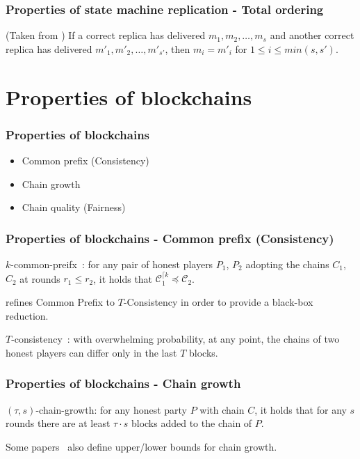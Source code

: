\documentclass{beamer}
\begin{document}
\begin{frame}
\frametitle{Properties of state machine replication - Total ordering}

(Taken from \cite{duan2018beat}) If a correct replica has delivered $m_1, m_2, \dots ,m_s$ and another correct replica has delivered $m'_1,m'_2, \dots,m'_{s'}$, then $m_i = m'_i$ for $1 \leq i \leq min(s, s')$.

\end{frame}


\section{Properties of blockchains}

\begin{frame}
\frametitle{Properties of blockchains}

\begin{itemize}
    \item Common prefix (Consistency)
    \item Chain growth
    \item Chain quality (Fairness)
\end{itemize}

\end{frame}


\begin{frame}
\frametitle{Properties of blockchains - Common prefix (Consistency)}

$k$-common-preifx~\cite{garay2015bitcoin}:
for any pair of honest players $P_1$, $P_2$ adopting the chains $C_1$, $C_2$ at rounds $r_1 \leq r_2$, it holds that $\mathcal{C}_{1}^{\lceil k} \preceq \mathcal{C}_2$.

\cite{pass2017analysis} refines Common Prefix to $T$-Consistency in order to provide a black-box reduction.

$T$-consistency~\cite{pass2017analysis}:
with overwhelming probability, at any point, the chains of two honest players can differ only in the last $T$ blocks.


\end{frame}

\begin{frame}
\frametitle{Properties of blockchains - Chain growth}

$(\tau, s)$-chain-growth:
for any honest party $P$ with chain $C$, it holds that for any $s$ rounds there are at least $\tau \cdot s$ blocks added to the chain of $P$.

Some papers~\cite{rocket2018snowflake}\cite{pass2017sleepy} also define upper/lower bounds for chain growth.


\end{frame}
\end{document}
